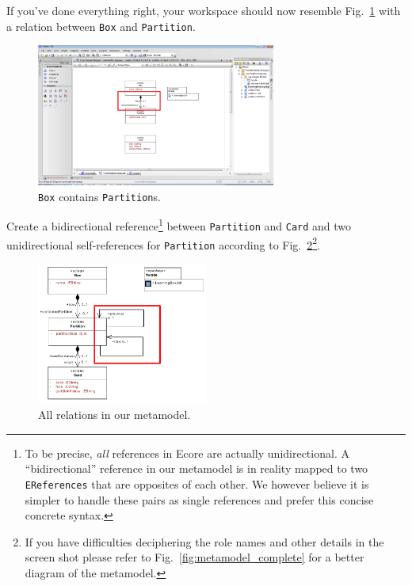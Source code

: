 \clearpage

If you've done everything right, your workspace should now resemble
Fig.~\ref{fig:ereference_completed} with a relation between \texttt{Box} and
\texttt{Partition}.

\begin{figure}[htbp] 
	\centering
  \includegraphics[width=0.7\textwidth]{pics/memBoxBilder/memBox28.png}
	\caption{\texttt{Box} contains \texttt{Partition}s.}
	\label{fig:ereference_completed}
\end{figure}

Create a bidirectional reference\footnote{To be precise, \emph{all} references
in Ecore are actually unidirectional.  A ``bidirectional'' reference in our
metamodel is in reality mapped to two \texttt{EReferences} that are opposites of
each other.  
We however believe it is simpler to handle these pairs as single references and
prefer this concise concrete syntax.} between \texttt{Partition} and \texttt{Card}
and two unidirectional self-references for \texttt{Partition} according to
Fig.~\ref{fig:ereferences_all}\footnote{If you have difficulties deciphering
the role names and other details in the screen shot please refer to
Fig.~\ref{fig:metamodel_complete} for a better diagram of the metamodel.}.
 
\begin{figure}[htbp]
	\centering
  \includegraphics[width=0.5\textwidth]{pics/memBoxBilder/memBox34.pdf}
	\caption{All relations in our metamodel.}
	\label{fig:ereferences_all}  
\end{figure}

